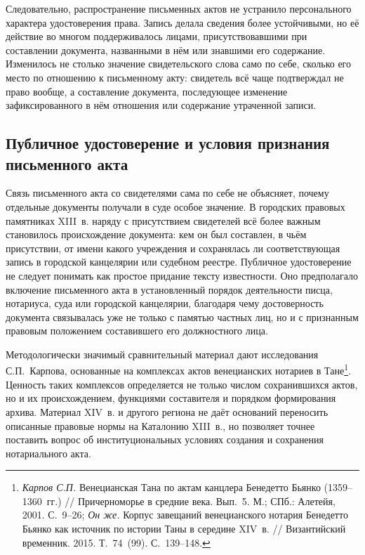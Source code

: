Следовательно, распространение письменных актов не устранило персонального характера удостоверения права. Запись делала сведения более устойчивыми, но её действие во многом поддерживалось лицами, присутствовавшими при составлении документа, названными в нём или знавшими его содержание. Изменилось не столько значение свидетельского слова само по себе, сколько его место по отношению к письменному акту: свидетель всё чаще подтверждал не право вообще, а составление документа, последующее изменение зафиксированного в нём отношения или содержание утраченной записи.

\subsection{Публичное удостоверение и условия признания письменного акта}

Связь письменного акта со свидетелями сама по себе не объясняет, почему отдельные документы получали в суде особое значение. В городских правовых памятниках XIII~в. наряду с присутствием свидетелей всё более важным становилось происхождение документа: кем он был составлен, в чьём присутствии, от имени какого учреждения и сохранялась ли соответствующая запись в городской канцелярии или судебном реестре. Публичное удостоверение не следует понимать как простое придание тексту известности. Оно предполагало включение письменного акта в установленный порядок деятельности писца, нотариуса, суда или городской канцелярии, благодаря чему достоверность документа связывалась уже не только с памятью частных лиц, но и с признанным правовым положением составившего его должностного лица.

Методологически значимый сравнительный материал дают исследования С.П.~Карпова, основанные на комплексах актов венецианских нотариев в Тане\footnote{\emph{Карпов С.П.} Венецианская Тана по актам канцлера Бенедетто Бьянко (1359--1360~гг.) // Причерноморье в средние века. Вып.~5. М.; СПб.: Алетейя, 2001. С.~9--26; \emph{Он же.} Корпус завещаний венецианского нотария Бенедетто Бьянко как источник по истории Таны в середине XIV~в. // Византийский временник. 2015. Т.~74~(99). С.~139--148.}. Ценность таких комплексов определяется не только числом сохранившихся актов, но и их происхождением, функциями составителя и порядком формирования архива. Материал XIV~в. и другого региона не даёт оснований переносить описанные правовые нормы на Каталонию XIII~в., но позволяет точнее поставить вопрос об институциональных условиях создания и сохранения нотариального акта.

